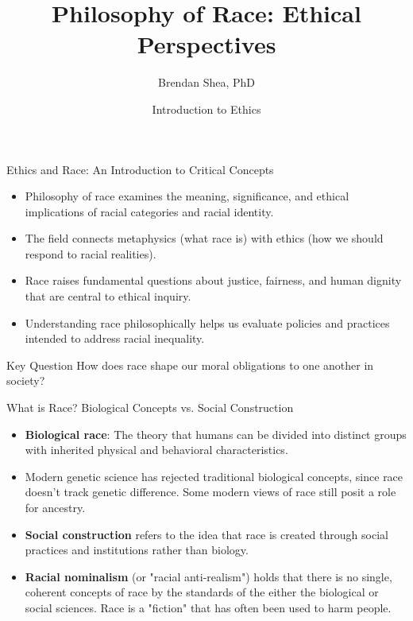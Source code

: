 \documentclass{beamer}
\title{Philosophy of Race: Ethical Perspectives}
\author{Brendan Shea, PhD}
\date{Introduction to Ethics}
\begin{document}
	
	\begin{frame}
		\titlepage
	\end{frame}
	
	\begin{frame}{Ethics and Race: An Introduction to Critical Concepts}
		\begin{itemize}
			\item Philosophy of race examines the meaning, significance, and ethical implications of racial categories and racial identity.
			\item The field connects metaphysics (what race is) with ethics (how we should respond to racial realities).
			\item Race raises fundamental questions about justice, fairness, and human dignity that are central to ethical inquiry.
			\item Understanding race philosophically helps us evaluate policies and practices intended to address racial inequality.
		\end{itemize}
		
		\begin{alertblock}{Key Question}
			How does race shape our moral obligations to one another in society?
		\end{alertblock}
	\end{frame}
	
	\begin{frame}{What is Race? Biological Concepts vs. Social Construction}
		\begin{itemize}
			\item \textbf{Biological race}: The theory that humans can be divided into distinct groups with inherited physical and behavioral characteristics. 
			\item Modern genetic science has rejected traditional biological concepts, since race doesn't track genetic difference. Some modern views of race still posit a role for ancestry. 
			\item \textbf{Social construction} refers to the idea that race is created through social practices and institutions rather than biology.
			\item \textbf{Racial nominalism} (or "racial anti-realism") holds that there is no single, coherent concepts of race by the standards of the either the biological or social sciences. Race is a "fiction" that has often been used to harm people. 
		\end{itemize}
		
	\end{frame}
	
\end{document}
